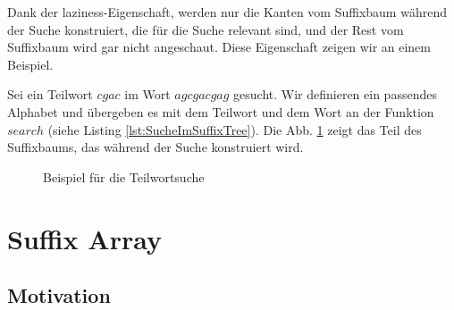 \documentclass[12pt]{report}
\begin{document}
Dank der laziness-Eigenschaft, werden nur die Kanten vom Suffixbaum während der Suche konstruiert, die für die Suche relevant sind, und der Rest vom Suffixbaum wird gar nicht angeschaut. Diese Eigenschaft zeigen wir an einem Beispiel.

Sei ein Teilwort $cgac$ im Wort $agcgacgag$ gesucht. Wir definieren ein passendes Alphabet und übergeben es mit dem Teilwort und dem Wort an der Funktion $search$ (siehe Listing \ref{lst:SucheImSuffixTree}). Die Abb. \ref{fig:teilwortuche} zeigt das Teil des Suffixbaums, das während der Suche konstruiert wird.

\begin{figure}[b]
\centering
{}
\caption{Beispiel für die Teilwortsuche}
\label{fig:teilwortuche}
\end{figure}

\chapter{Suffix Array}
\label{sec:SuffixArray}

\section{Motivation}
\label{sec:Motivation}
\end{document}
